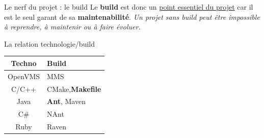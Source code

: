 \documentclass[handout]{beamer}
\begin{document}
\begin{frame}
	\begin{block}{Le nerf du projet : le build}
	 	Le \textbf{build} est donc un \underline{point essentiel du projet} car
		il est le seul garant de sa \textbf{maintenabilité}.
		\textit{Un projet sans build peut être impossible à reprendre, à maintenir ou à faire évoluer.}
	\end{block}
 	\begin{block}{La relation technologie/build}
		\begin{center}
			\begin{tabular}{|c|l|}
				\hline
				\textbf{Techno} & \textbf{Build} \\ 
				\hline
				OpenVMS & MMS  \\ 
				\hline
				C/C++ & CMake,\textbf{Makefile} \\ 
				\hline
				Java & \textbf{Ant}, Maven \\
				\hline
				C\# & NAnt \\
				\hline
				Ruby & Raven \\
				\hline 
			\end{tabular}
		\end{center}



 	\end{block}
\end{frame}
\end{document}
